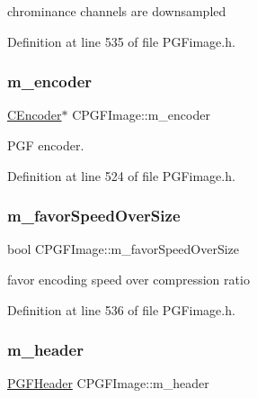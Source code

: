 chrominance channels are downsampled 



Definition at line 535 of file P\+G\+Fimage.\+h.

\mbox{\label{classCPGFImage_a6ef048255812525cd56d7b04df5e6731}} 
\subsubsection{\texorpdfstring{m\_encoder}{m\_encoder}}
{\footnotesize\ttfamily \mbox{\hyperlink{classCEncoder}{C\+Encoder}}$\ast$ C\+P\+G\+F\+Image\+::m\+\_\+encoder\hspace{0.3cm}{\ttfamily [protected]}}



P\+GF encoder. 



Definition at line 524 of file P\+G\+Fimage.\+h.

\mbox{\label{classCPGFImage_a6925d3950e8f48487205d46de7920d3e}} 
\subsubsection{\texorpdfstring{m\_favorSpeedOverSize}{m\_favorSpeedOverSize}}
{\footnotesize\ttfamily bool C\+P\+G\+F\+Image\+::m\+\_\+favor\+Speed\+Over\+Size\hspace{0.3cm}{\ttfamily [protected]}}



favor encoding speed over compression ratio 



Definition at line 536 of file P\+G\+Fimage.\+h.

\mbox{\label{classCPGFImage_a1a45b90decf13d8e8243bd84bac690d0}} 
\subsubsection{\texorpdfstring{m\_header}{m\_header}}
{\footnotesize\ttfamily \mbox{\hyperlink{structPGFHeader}{P\+G\+F\+Header}} C\+P\+G\+F\+Image\+::m\+\_\+header\hspace{0.3cm}{\ttfamily [protected]}}



